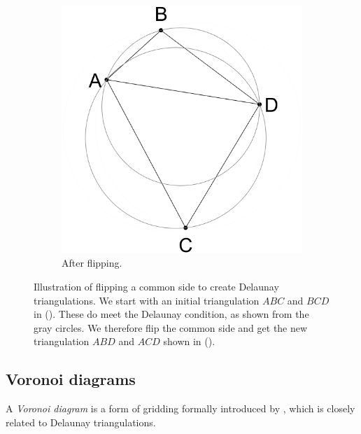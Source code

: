 \begin{figure}[ht]
\begin{subfigure}[b]{0.3\textwidth}
        \includegraphics[width=\textwidth]{report/Images/Theory/delaunay-flipping/delaunay_flipping_delaunay.png}
        \caption{After flipping.}
        \label{fig:delaunay-flipping-after}
    \end{subfigure}
    \caption[Illustration of flipping a common side to create Delaunay triangulations]{Illustration of flipping a common side to create Delaunay triangulations. We start with an initial triangulation $ABC$ and $BCD$ in (). These do meet the Delaunay condition, as shown from the gray circles. We therefore flip the common side and get the new triangulation $ABD$ and $ACD$ shown in ().}
    \label{fig:Delaunay-flipping}
\end{figure}


\subsection{Voronoi diagrams}
A \emph{Voronoi diagram} is a form of gridding formally introduced by \textcite{VoronoiNouvellesAD}, which is closely related to Delaunay triangulations. 

